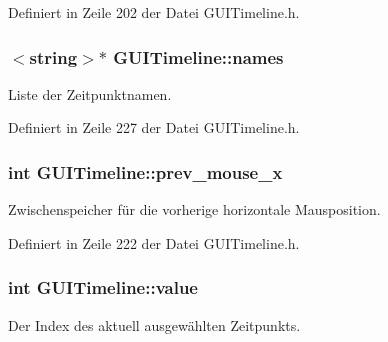 Definiert in Zeile 202 der Datei G\-U\-I\-Timeline.\-h.

\hypertarget{classGUITimeline_adcdd8d58db7851c24ab9dfdfe1377ffb}{
\subsubsection[{names}]{$<$string$>$$\ast$ G\-U\-I\-Timeline\-::names\hspace{0.3cm}{\ttfamily [private]}}}\label{classGUITimeline_adcdd8d58db7851c24ab9dfdfe1377ffb}


Liste der Zeitpunktnamen. 



Definiert in Zeile 227 der Datei G\-U\-I\-Timeline.\-h.

\hypertarget{classGUITimeline_a16d456832948e97e9364856f92d97f5c}{
\subsubsection[{prev\-\_\-mouse\-\_\-x}]{\setlength{\rightskip}{0pt plus 5cm}int G\-U\-I\-Timeline\-::prev\-\_\-mouse\-\_\-x\hspace{0.3cm}{\ttfamily [private]}}}\label{classGUITimeline_a16d456832948e97e9364856f92d97f5c}


Zwischenspeicher für die vorherige horizontale Mausposition. 



Definiert in Zeile 222 der Datei G\-U\-I\-Timeline.\-h.

\hypertarget{classGUITimeline_a0ba036e4a58176c5e868662510717ae2}{
\subsubsection[{value}]{\setlength{\rightskip}{0pt plus 5cm}int G\-U\-I\-Timeline\-::value\hspace{0.3cm}{\ttfamily [private]}}}\label{classGUITimeline_a0ba036e4a58176c5e868662510717ae2}


Der Index des aktuell ausgewählten Zeitpunkts. 



